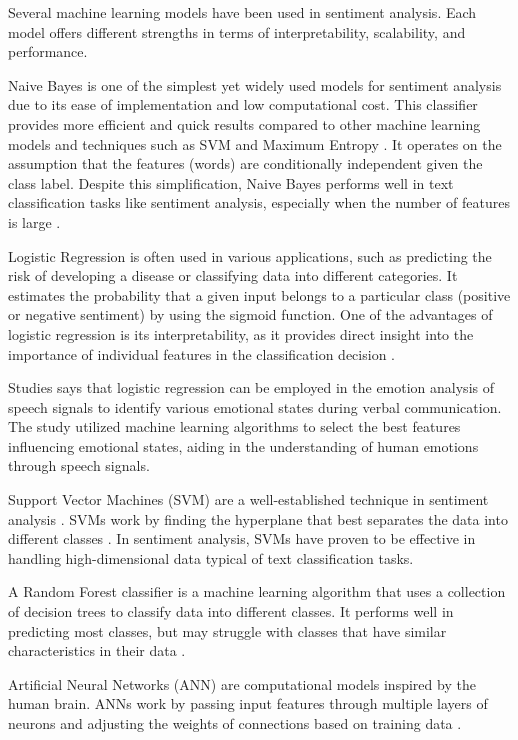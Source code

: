 Several machine learning models have been used in sentiment analysis. Each model offers different strengths in terms of interpretability, scalability, and performance.

Naive Bayes is one of the simplest yet widely used models for sentiment analysis due to its ease of implementation and low computational cost. This classifier provides more efficient and quick results compared to other machine learning models and techniques such as SVM and Maximum Entropy \cite{Mathapati2017}. It operates on the assumption that the features (words) are conditionally independent given the class label. Despite this simplification, Naive Bayes performs well in text classification tasks like sentiment analysis, especially when the number of features is large \cite{Saini2021}.

Logistic Regression is often used in various applications, such as predicting the risk of developing a disease or classifying data into different categories. It estimates the probability that a given input belongs to a particular class (positive or negative sentiment) by using the sigmoid function. One of the advantages of logistic regression is its interpretability, as it provides direct insight into the importance of individual features in the classification decision \cite{Pathan2018}.

Studies says that logistic regression can be employed in the emotion analysis of speech signals to identify various emotional states during verbal communication. The study utilized machine learning algorithms to select the best features influencing emotional states, aiding in the understanding of human emotions through speech signals\cite{Poovammal2016}.

Support Vector Machines (SVM) are a well-established technique in sentiment analysis \cite{Mahmood2020}. SVMs work by finding the hyperplane that best separates the data into different classes \cite{Gillet2007}. In sentiment analysis, SVMs have proven to be effective in handling high-dimensional data typical of text classification tasks.

A Random Forest classifier is a machine learning algorithm that uses a collection of decision trees to classify data into different classes. It performs well in predicting most classes, but may struggle with classes that have similar characteristics in their data \cite{Senturk2023}.

Artificial Neural Networks (ANN) are computational models inspired by the human brain. ANNs work by passing input features through multiple layers of neurons and adjusting the weights of connections based on training data \cite{Walczak2003}.

